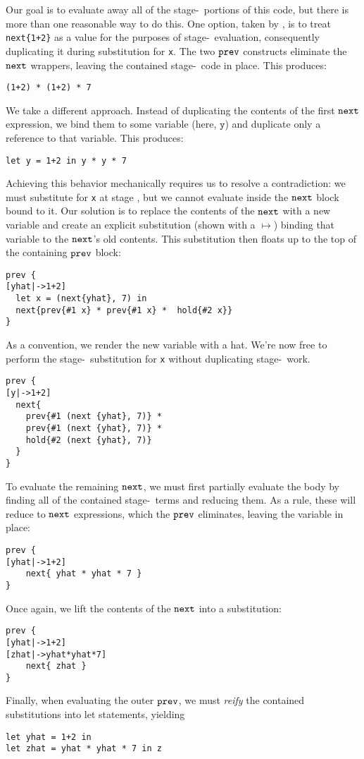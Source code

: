 Our goal is to evaluate away all of the stage-\bbone\ portions of this code, but there is more than one reasonable way to do this.
One option, taken by \cite{davies96}, is to treat \verb|next{1+2}| as a value for the purposes of stage-\bbone~evaluation, 
consequently duplicating it during substitution for {\tt x}.  The two ${\tt prev}$ constructs eliminate the ${\tt next}$ wrappers,
leaving the contained stage-\bbtwo\ code in place.
This produces:
\begin{lstlisting}
(1+2) * (1+2) * 7
\end{lstlisting}

We take a different approach.  
Instead of duplicating the contents of the first ${\tt next}$ expression, we bind them to some variable (here, $\mathtt{y}$) and
duplicate only a reference to that variable.  This produces:
\begin{lstlisting} 
let y = 1+2 in y * y * 7
\end{lstlisting}

Achieving this behavior mechanically requires us to resolve a contradiction:
we must substitute for \texttt{x} at stage \bbone, but we cannot evaluate inside the ${\tt next}$ block bound to it. 
Our solution is to replace the contents of the ${\tt next}$ with a new variable and create an explicit substitution (shown with a $\mapsto$) binding that variable to the ${\tt next}$'s old contents.  
This substitution then floats up to the top of the containing ${\tt prev}$ block:
\begin{lstlisting} 
prev {
[yhat|->1+2]
  let x = (next{yhat}, 7) in
  next{prev{#1 x} * prev{#1 x} *  hold{#2 x}}
}
\end{lstlisting}
As a convention, we render the new variable with a %
hat.  We're now free to perform the stage-\bbone~substitution for {\tt x} without duplicating stage-\bbtwo\ work.
\begin{lstlisting} 
prev {
[y|->1+2]
  next{
    prev{#1 (next {yhat}, 7)} * 
    prev{#1 (next {yhat}, 7)} *
    hold{#2 (next {yhat}, 7)}
  }
}
\end{lstlisting}
To evaluate the remaining ${\tt next}$, we must first partially evaluate the body by finding all of the contained stage-\bbone~terms and reducing them. 
As a rule, these will reduce to ${\tt next}$ expressions, which the ${\tt prev}$ eliminates, leaving the variable in place:
\begin{lstlisting} 
prev {
[yhat|->1+2]
    next{ yhat * yhat * 7 }
}
\end{lstlisting}
Once again, we lift the contents of the ${\tt next}$ into a substitution:
\begin{lstlisting} 
prev {
[yhat|->1+2]
[zhat|->yhat*yhat*7]
    next{ zhat }
}
\end{lstlisting}
Finally, when evaluating the outer ${\tt prev}$, we must {\em reify} the contained substitutions into let statements, yielding
\begin{lstlisting} 
let yhat = 1+2 in
let zhat = yhat * yhat * 7 in z
\end{lstlisting}

